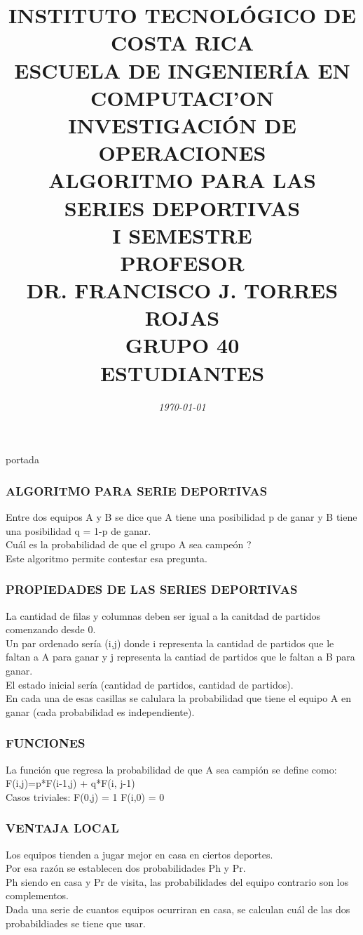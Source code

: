 \documentclass[10]{beamer}
\title{{\color{WHITE} \large \textbf{INSTITUTO TECNOL\'OGICO DE COSTA RICA}} \\ \vspace{0.02cm} 
{\color{WHITE} \large \textbf{ESCUELA DE INGENIER\'IA EN COMPUTACI'ON }} \\ \vspace{0.02cm} 
{\color{WHITE} \large \textbf{INVESTIGACI\'ON DE OPERACIONES  }} \\ \vspace{0.02cm} 
{\color{WHITE} \large \textbf{ALGORITMO PARA LAS \\ SERIES DEPORTIVAS  }} \\ \vspace{0.02cm} 
{\color{WHITE} \large \textbf{I SEMESTRE  }}\\ \vspace{0.02cm}
{\color{WHITE} \large \textbf{PROFESOR}} \\ \vspace{0.02cm}
{\color{WHITE} \large DR. FRANCISCO J. TORRES ROJAS  } \\ \vspace{0.02cm}
{\color{WHITE} \large \textbf{GRUPO 40}} \\ \vspace{0.01cm}
{\color{WHITE} \large \textbf{ESTUDIANTES} }}
\date{\em \color{WHITE} \today}
\begin{document}
\begin{frame}
\color{white}
\titlepage portada
\end{frame} 
\begin{frame}
\color{white}
\frametitle{ALGORITMO PARA SERIE DEPORTIVAS}
Entre dos equipos A y B se dice que A tiene una posibilidad p de ganar y B tiene una posibilidad q = 1-p de ganar.
\\ Cu\'al es la probabilidad de que el grupo A sea campe\'on ?
\\Este algoritmo permite contestar esa pregunta.
\end{frame} 
\begin{frame}
\color{white}
\frametitle{PROPIEDADES DE LAS SERIES DEPORTIVAS}
La cantidad de filas y columnas deben ser igual a la canitdad de partidos comenzando desde 0.
\\ Un par ordenado ser\'ia (i,j) donde i representa la cantidad de partidos que le faltan a A para ganar y j representa la cantiad de partidos que le faltan a B para ganar.
\\El estado inicial ser\'ia (cantidad de partidos, cantidad de partidos).
\\ En cada una de esas casillas se calulara la probabilidad que tiene el equipo A en ganar (cada probabilidad es independiente).
\end{frame} 
\begin{frame}
\color{white}
\frametitle{FUNCIONES}
La funci\'on que regresa la probabilidad de que A sea campi\'on se define como:
\\F(i,j)=p*F(i-1,j) + q*F(i, j-1) 
\\ Casos triviales: F(0,j) = 1    F(i,0) = 0
\end{frame} 
\begin{frame}
\color{white}
\frametitle{VENTAJA LOCAL}
Los equipos tienden a jugar mejor en casa en ciertos deportes.
\\Por esa raz\'on se establecen dos probabilidades Ph y Pr. 
\\ Ph siendo en casa y Pr de visita, las probabilidades del equipo contrario son los complementos.
\\ Dada una serie de cuantos equipos ocurriran en casa, se calculan cu\'al de las dos probabildiades se tiene que usar.
\end{frame} 
\end{document}
